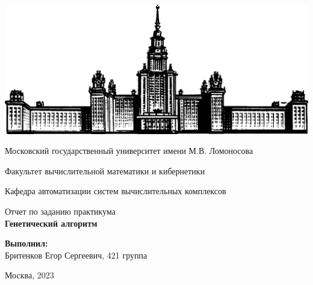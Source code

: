 \documentclass[a4paper,12pt,titlepage,final]{article}
\begin{document}
\begin{titlepage}
  \begin{center}

    \includegraphics[scale=0.2]{gzlogo}\\
    \small
    \centerline{Московский государственный университет имени М.В. Ломоносова}
    \centerline{Факультет вычислительной математики и кибернетики}
    \centerline{Кафедра автоматизации систем вычислительных комплексов}
    \centerline{}

    
    \Large
    \vfill
    {Отчет по заданию практикума}\\
    {\LARGE \bf
      Генетический алгоритм
    }\\
    \null \null
    
  \end{center}
  
  \begin{flushright}
    {\bf Выполнил:}\\
    Бритенков Егор Сергеевич, 421 группа\\
    \vfill
  \end{flushright}

\centerline{Москва, 2023}
\end{titlepage}

\tableofcontents
\newpage
\end{document}
